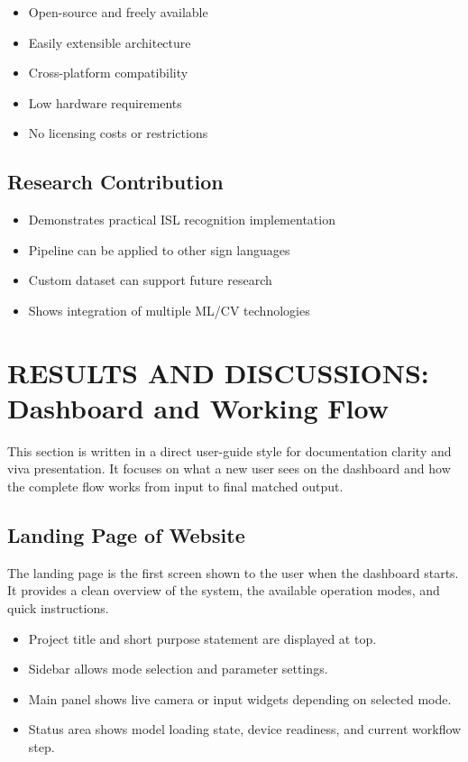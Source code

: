 \begin{itemize}
    \item Open-source and freely available
    \item Easily extensible architecture
    \item Cross-platform compatibility
    \item Low hardware requirements
    \item No licensing costs or restrictions
\end{itemize}

\subsection{Research Contribution}

\begin{itemize}
    \item Demonstrates practical ISL recognition implementation
    \item Pipeline can be applied to other sign languages
    \item Custom dataset can support future research
    \item Shows integration of multiple ML/CV technologies
\end{itemize}

\clearpage
\section{RESULTS AND DISCUSSIONS: Dashboard and Working Flow}

This section is written in a direct user-guide style for documentation clarity and viva presentation. It focuses on what a new user sees on the dashboard and how the complete flow works from input to final matched output.

\subsection{Landing Page of Website}

The landing page is the first screen shown to the user when the dashboard starts. It provides a clean overview of the system, the available operation modes, and quick instructions.

\begin{itemize}
    \item Project title and short purpose statement are displayed at top.
    \item Sidebar allows mode selection and parameter settings.
    \item Main panel shows live camera or input widgets depending on selected mode.
    \item Status area shows model loading state, device readiness, and current workflow step.
\end{itemize}

